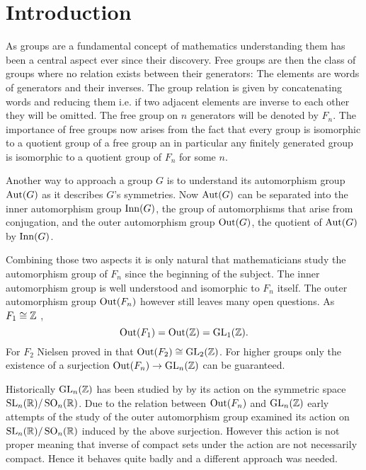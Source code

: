 %

\usepackage{todonotes}
\usepackage{./tikzit/tikzit}
\usepackage{biblatex}


\usepackage[stable]{footmisc}

	

\tableofcontents
\newpage
\section{Introduction}
As groups are a fundamental concept of mathematics understanding them has been a central aspect ever since their discovery.
Free groups are then the class of groups where no relation exists between their generators: 
The elements are words of generators and their inverses. The group relation is given by concatenating words
and reducing them i.e. if two adjacent elements are inverse to each other they will be omitted.
The free group on $n$ generators will be denoted by $F_{n}$.
The importance of free groups now arises from the fact that every group is isomorphic to a quotient group of a free group
an in particular any finitely generated group is isomorphic to a quotient group of $F_{n}$ for some $n$.

Another way to approach a group $G$ is to understand its automorphism group $\operatorname{Aut}(G)$ as it describes $G$'s symmetries.
Now $\operatorname{Aut}(G)$ can be separated into the inner automorphism group $\operatorname{Inn}(G)$,
the group of automorphisms that arise from conjugation, and the outer automorphism group $\operatorname{Out}(G)$, the quotient of  $\operatorname{Aut}(G)$ by $\operatorname{Inn}(G)$.

Combining those two aspects it is only natural that mathematicians study the automorphism group of $F_{n}$ since the beginning of the subject.
The inner automorphism group is well understood and isomorphic to $F_{n}$ itself.
The outer automorphism group $\operatorname{Out}(F_{n})$ however still leaves many open questions.
As $F_{1} \cong \mathbb{Z}$ ,
\[
	\operatorname{Out}(F_1) = \operatorname{Out}(\mathbb{Z}) = \operatorname{GL}_{1}(\mathbb{Z})
.\] 
For $F_{2}$ Nielsen proved in \cite{nielsen17} that $\operatorname{Out}(F_2) \cong \operatorname{GL}_{2}(\mathbb{Z})$.
For higher groups only the existence of a surjection $\operatorname{Out}(F_{n}) \to \operatorname{GL}_{n}(\mathbb{Z})$ can be guaranteed.

Historically $\operatorname{GL}_{n}(\mathbb{Z})$ has been studied by by its action on the symmetric space $\operatorname{SL}_{n}(\mathbb{R}) / \operatorname{SO}_{n}(\mathbb{R})$.
Due to the relation between $\operatorname{Out}(F_{n})$ and $\operatorname{GL}_{n}(\mathbb{Z})$ early attempts of the study of the outer automorphism group
examined its action on $\operatorname{SL}_{n}(\mathbb{R}) / \operatorname{SO}_{n}(\mathbb{R})$ induced by the above surjection.
However this action is not proper meaning that inverse of compact sets under the action are not necessarily compact.
Hence it behaves quite badly and a different approach was needed.


